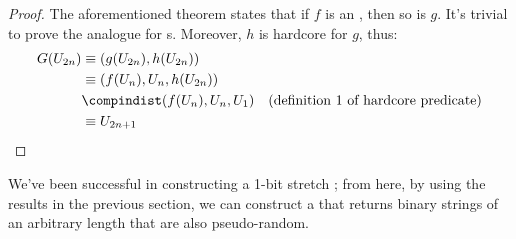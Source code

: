 \begin{proof}
    The aforementioned theorem states that if $f$ is an \owf, then so is $g$. It's trivial to prove the analogue for \owp{}s. Moreover, $h$ is hardcore for $g$, thus:
    \begin{align*}
        G(U_{2n}) &\equiv (g(U_{2n}), h(U_{2n})) & \\
        &\equiv (f(U_n), U_n, h(U_{2n})) & \\
        &\compindist (f(U_{n}), U_{n}, U_{1}) & \text{(definition 1 of hardcore predicate)} \\
        &\equiv U_{2n+1} &
    \end{align*}

\end{proof}

We've been successful in constructing a 1-bit stretch \prg; from here, by using the results in the previous section, we can construct a \prg{} that returns binary strings of an arbitrary length that are also pseudo-random.
